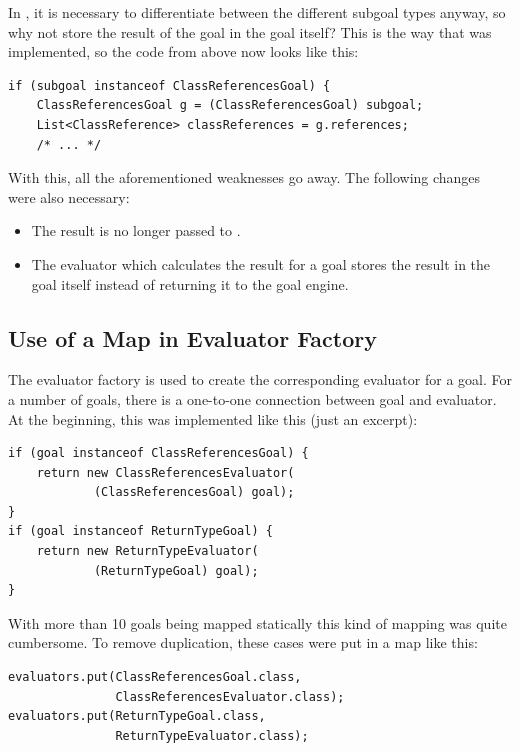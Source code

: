 \documentclass[12pt,halfparskip,DIV11,BCOR10mm]{scrreprt}
\begin{document}
In , it is necessary to differentiate between the different subgoal types anyway, so why not store the result of the goal in the goal itself? This is the way that was implemented, so the code from above now looks like this:

\begin{lstlisting}[style=java]
if (subgoal instanceof ClassReferencesGoal) {
    ClassReferencesGoal g = (ClassReferencesGoal) subgoal;
    List<ClassReference> classReferences = g.references;
    /* ... */
\end{lstlisting}

With this, all the aforementioned weaknesses go away. The following changes were also necessary:

\begin{itemize}
    \item The result is no longer passed to .
    \item The evaluator which calculates the result for a goal stores the result in the goal itself instead of returning it to the goal engine.
\end{itemize}


\subsection{Use of a Map in Evaluator Factory}


The evaluator factory is used to create the corresponding evaluator for a goal. For a number of goals, there is a one-to-one connection between goal and evaluator. At the beginning, this was implemented like this (just an excerpt):

\begin{lstlisting}[style=java]
if (goal instanceof ClassReferencesGoal) {
    return new ClassReferencesEvaluator(
            (ClassReferencesGoal) goal);
}
if (goal instanceof ReturnTypeGoal) {
    return new ReturnTypeEvaluator(
            (ReturnTypeGoal) goal);
}
\end{lstlisting}

With more than 10 goals being mapped statically this kind of mapping was quite cumbersome. To remove duplication, these cases were put in a map like this:

\begin{lstlisting}[style=java]
evaluators.put(ClassReferencesGoal.class,
               ClassReferencesEvaluator.class);
evaluators.put(ReturnTypeGoal.class,
               ReturnTypeEvaluator.class);
\end{lstlisting}
\end{document}
